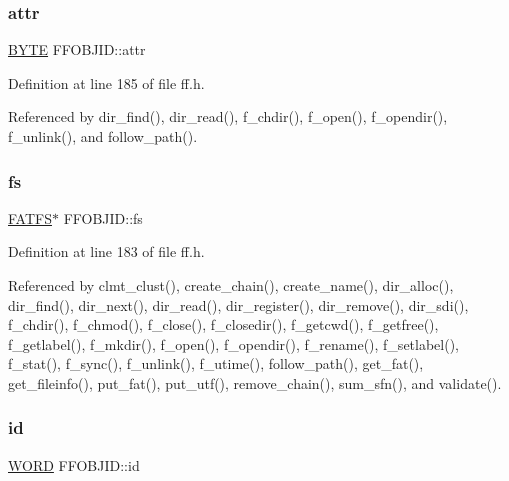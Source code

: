 \subsubsection{\texorpdfstring{attr}{attr}}
{\footnotesize\ttfamily \hyperlink{ff_8h_a4ae1dab0fb4b072a66584546209e7d58}{B\+Y\+TE} F\+F\+O\+B\+J\+I\+D\+::attr}



Definition at line 185 of file ff.\+h.



Referenced by dir\+\_\+find(), dir\+\_\+read(), f\+\_\+chdir(), f\+\_\+open(), f\+\_\+opendir(), f\+\_\+unlink(), and follow\+\_\+path().

\mbox{\label{structFFOBJID_a867089659a2374d44ab917c60037fe5c}} 
\subsubsection{\texorpdfstring{fs}{fs}}
{\footnotesize\ttfamily \hyperlink{structFATFS}{F\+A\+T\+FS}$\ast$ F\+F\+O\+B\+J\+I\+D\+::fs}



Definition at line 183 of file ff.\+h.



Referenced by clmt\+\_\+clust(), create\+\_\+chain(), create\+\_\+name(), dir\+\_\+alloc(), dir\+\_\+find(), dir\+\_\+next(), dir\+\_\+read(), dir\+\_\+register(), dir\+\_\+remove(), dir\+\_\+sdi(), f\+\_\+chdir(), f\+\_\+chmod(), f\+\_\+close(), f\+\_\+closedir(), f\+\_\+getcwd(), f\+\_\+getfree(), f\+\_\+getlabel(), f\+\_\+mkdir(), f\+\_\+open(), f\+\_\+opendir(), f\+\_\+rename(), f\+\_\+setlabel(), f\+\_\+stat(), f\+\_\+sync(), f\+\_\+unlink(), f\+\_\+utime(), follow\+\_\+path(), get\+\_\+fat(), get\+\_\+fileinfo(), put\+\_\+fat(), put\+\_\+utf(), remove\+\_\+chain(), sum\+\_\+sfn(), and validate().

\mbox{\label{structFFOBJID_afc765e01ff97bfd9645c42b0ba30397f}} 
\subsubsection{\texorpdfstring{id}{id}}
{\footnotesize\ttfamily \hyperlink{ff_8h_a197942eefa7db30960ae396d68339b97}{W\+O\+RD} F\+F\+O\+B\+J\+I\+D\+::id}



